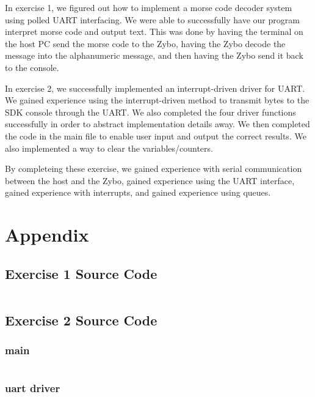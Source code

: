 \documentclass[11pt, letterpaper, titlepage]{article}
\begin{document}
In exercise 1, we figured out how to implement a morse code decoder system using polled UART interfacing. We were able to successfully have our program interpret morse code and output text. This was done by having the terminal on the host PC send the morse code to the Zybo, having the Zybo decode the message into the alphanumeric message, and then having the Zybo send it back to the console. 

In exercise 2, we successfully implemented an interrupt-driven driver for UART. We gained experience using the interrupt-driven method to transmit bytes to the SDK console through the UART. We also completed the four driver functions successfully in order to abstract implementation details away. We then completed the code in the main file to enable user input and output the correct results. We also implemented a way to clear the variables/counters.

By completeing these exercise, we gained experience with serial communication between the host and the Zybo, gained experience using the UART interface, gained experience with interrupts, and gained experience using queues.

\newpage
\section{Appendix}
\subsection{Exercise 1 Source Code}
\label{e1}
\footnotesize
\inputminted{c}{lab2_part1.c}
\normalsize

\newpage

\subsection{Exercise 2 Source Code}
\label{e2}
\subsubsection{main}
\footnotesize
\inputminted{c}{part2_lab2_main.c}
\normalsize

\subsubsection{uart driver}
\footnotesize
\inputminted{c}{uart_driver.h}
\normalsize
\end{document}

